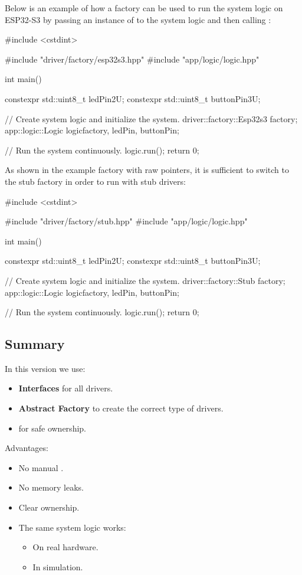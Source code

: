 Below is an example of how a factory can be used to run the system logic on ESP32-S3 by passing an
instance of  to the system logic and then calling :

\begin{cppcode}
#include <cstdint>

#include "driver/factory/esp32s3.hpp"
#include "app/logic/logic.hpp"

int main()
{
    constexpr std::uint8_t ledPin{2U};
    constexpr std::uint8_t buttonPin{3U};

    // Create system logic and initialize the system.
    driver::factory::Esp32s3 factory{};
    app::logic::Logic logic{factory, ledPin, buttonPin};

    // Run the system continuously.
    logic.run();
    return 0;
}
\end{cppcode}

\noindent As shown in the example factory with raw pointers, it is sufficient to switch to the stub
factory  in order to run with stub drivers:

\begin{cppcode}
#include <cstdint>

#include "driver/factory/stub.hpp"
#include "app/logic/logic.hpp"

int main()
{
    constexpr std::uint8_t ledPin{2U};
    constexpr std::uint8_t buttonPin{3U};

    // Create system logic and initialize the system.
    driver::factory::Stub factory{};
    app::logic::Logic logic{factory, ledPin, buttonPin};

    // Run the system continuously.
    logic.run();
    return 0;
}
\end{cppcode}

\subsection{Summary}
\label{c4:sec:smartsummary}
In this version we use:
\begin{itemize}
  \item \textbf{Interfaces} for all drivers.
  \item \textbf{Abstract Factory} to create the correct type of drivers.
  \item \textbf{} for safe ownership.
\end{itemize}
Advantages:
\begin{itemize}
  \item No manual .
  \item No memory leaks.
  \item Clear ownership.
  \item The same system logic works:
  \begin{itemize}
    \item On real hardware.
    \item In simulation.
  \end{itemize}
\end{itemize}
